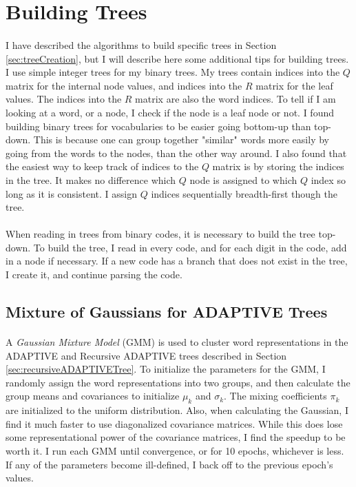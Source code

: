 \section{Building Trees}
\paragraph{}
I have described the algorithms to build specific trees in Section \ref{sec:treeCreation}, but I will describe here some additional tips for building trees. I use simple integer trees for my binary trees. My trees contain indices into the $Q$ matrix for the internal node values, and indices into the $R$ matrix for the leaf values. The indices into the $R$ matrix are also the word indices. To tell if I am looking at a word, or a node, I check if the node is a leaf node or not.  I found building binary trees for vocabularies to be easier going bottom-up than top-down. This is because one can group together "similar" words more easily by going from the words to the nodes, than the other way around. I also found that the easiest way to keep track of indices to the $Q$ matrix is by storing the indices in the tree. It makes no difference which $Q$ node is assigned to which $Q$ index so long as it is consistent. I assign $Q$ indices sequentially breadth-first though the tree. 
\paragraph{}
When reading in trees from binary codes, it is necessary to build the tree top-down. To build the tree, I read in every code, and for each digit in the code, add in a node if necessary. If a new code has a branch that does not exist in the tree, I create it, and continue parsing the code.

\subsection{Mixture of Gaussians for ADAPTIVE Trees}
\paragraph{}
A \emph{Gaussian Mixture Model} (GMM) is used to cluster word representations in the ADAPTIVE and Recursive ADAPTIVE trees described in Section \ref{sec:recursiveADAPTIVETree}. To initialize the parameters for the GMM, I randomly assign the word representations into two groups, and then calculate the group means and covariances to initialize $\mu_k$ and $\sigma_k$. The mixing coefficients $\pi_k$ are initialized to the uniform distribution. Also, when calculating the Gaussian, I find it much faster to use diagonalized covariance matrices. While this does lose some representational power of the covariance matrices, I find the speedup to be worth it. I run each GMM until convergence, or for 10 epochs, whichever is less. If any of the parameters become ill-defined, I back off to the previous epoch's values. 

